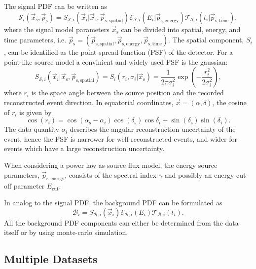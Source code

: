 \documentclass{article}
\newcommand{\ps}{\vec{p}_{\mathrm{s}}}
\newcommand{\xs}{\vec{x}_{\mathrm{s}}}
\begin{document}
The signal PDF can be written as
\begin{equation}
 \mathcal{S}_i(\xs,\ps) = S_{\mathcal{S},i}(\vec{x}_i|\xs,\vec{p}_{\mathrm{s,spatial}}) \mathcal{E}_{\mathcal{S},i}(E_i|\vec{p}_{\mathrm{s,energy}}) \mathcal{T}_{\mathcal{S},i}(t_i|\vec{p}_{\mathrm{s,time}}),
\end{equation}
where the signal model parameters $\xs$ can be divided into spatial, energy, and
time parameters, i.e. $\vec{p}_{\mathrm{s}} = (\vec{p}_{\mathrm{s,spatial}},
\vec{p}_{\mathrm{s,energy}}, \vec{p}_{\mathrm{s,time}})$. The spatial component,
$S_i$, can be identified as the point-spread-function (PSF) of the detector.
For a point-like source model a convinient and widely used PSF is the gaussian:
\begin{equation}
 S_{\mathcal{S},i}(\vec{x}_i|\xs,\vec{p}_{\mathrm{s,spatial}}) = S_i(r_i,\sigma_i|\xs) = \frac{1}{2\pi\sigma_i^2}\exp\left({-\frac{r_i^2}{2\sigma_i^2}}\right),
\end{equation}
where $r_i$ is the space angle between the source position and the recorded
reconstructed event direction. In equatorial coordinates,
$\vec{x} = (\alpha,\delta)$, the cosine of $r_i$ is given by
\begin{equation}
 \cos(r_i) = \cos(\alpha_{\mathrm{s}} - \alpha_i) \cos(\delta_{\mathrm{s}})\cos{\delta_i} + \sin(\delta_{\mathrm{s}})\sin(\delta_i).
\end{equation}
The data quantity $\sigma_i$ describes the angular reconstruction uncertainty of
the event, hence the PSF is narrower for well-reconstructed events, and wider
for events which have a large reconstruction uncertainty.

When considering a power law as source flux model, the energy source parameters,
$\vec{p}_{\mathrm{s,energy}}$, consists of the spectral index $\gamma$ and possibly
an energy cut-off parameter $E_{\mathrm{cut}}$.

In analog to the signal PDF, the background PDF can be formulated as
\begin{equation}
 \mathcal{B}_i = S_{\mathcal{B},i}(\vec{x}_i) \mathcal{E}_{\mathcal{B},i}(E_i) \mathcal{T}_{\mathcal{B},i}(t_i).
\end{equation}
All the background PDF components can either be determined from the data itself
or by using monte-carlo simulation.


\subsection{Multiple Datasets}
\end{document}
